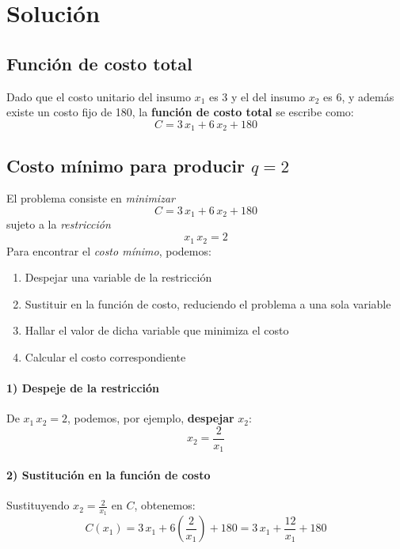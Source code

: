 \documentclass{article}
\begin{document}

\newpage
\section*{Solución}

\subsection*{Función de costo total}

Dado que el costo unitario del insumo \(x_1\) es 3 y el del insumo \(x_2\) es 6, y además existe un costo fijo de 180, la \textbf{función de costo total} se escribe como:
\[
C = 3\,x_1 + 6\,x_2 + 180
\]

\bigskip

\subsection*{Costo mínimo para producir \(q=2\)}

El problema consiste en \emph{minimizar}
\[
C = 3\,x_1 + 6\,x_2 + 180
\]
sujeto a la \emph{restricción}
\[
x_1 \, x_2 = 2
\]
Para encontrar el \emph{costo mínimo}, podemos:

\begin{enumerate}
    \item Despejar una variable de la restricción
    \item Sustituir en la función de costo, reduciendo el problema a una sola variable
    \item Hallar el valor de dicha variable que minimiza el costo
    \item Calcular el costo correspondiente
\end{enumerate}

\paragraph{1) Despeje de la restricción}

De \(x_1 \, x_2 = 2\), podemos, por ejemplo, \textbf{despejar} \(x_2\):
\[
x_2 = \frac{2}{x_1}
\]

\paragraph{2) Sustitución en la función de costo}

Sustituyendo \(x_2 = \frac{2}{x_1}\) en \(C\), obtenemos:
\[
C(x_1) = 3\,x_1 + 6\left(\frac{2}{x_1}\right) + 180
       = 3\,x_1 + \frac{12}{x_1} + 180
\]
\end{document}
